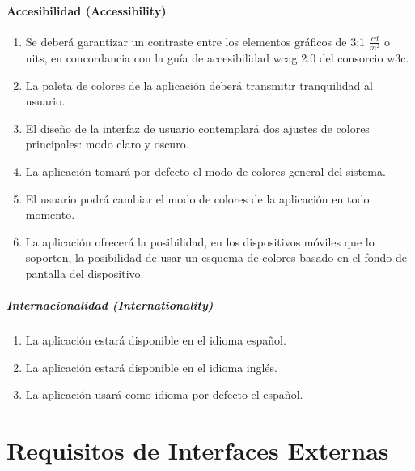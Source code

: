             \paragraph{Accesibilidad (Accessibility)}
                \begin{enumerate}[resume, label=\textbf{\texttt{RNF-\arabic*}}]
                    \item \label{req:no_funcionales:contraste} Se deberá garantizar un contraste entre los elementos gráficos de 3:1 $\frac{cd}{m^{2}}$ o nits, en concordancia con la guía de accesibilidad \gls{wcag} 2.0 del consorcio \gls{w3c}\cite{w3c_web_2008}.
                    \item \label{req:no_funcionales:colores_tranquilidad} La paleta de colores de la aplicación deberá transmitir tranquilidad al usuario.
                    \item \label{req:no_funcionales:modo_claro_oscuro} El diseño de la interfaz de usuario contemplará dos ajustes de colores principales: modo claro y oscuro.
                    \item \label{req:no_funcionales:modo_defecto} La aplicación tomará por defecto el modo de colores general del sistema.
                    \item \label{req:no_funcionales:modo_demanda} El usuario podrá cambiar el modo de colores de la aplicación en todo momento. 
                    \item \label{req:no_funcionales:colores_dinamico} La aplicación ofrecerá la posibilidad, en los dispositivos móviles que lo soporten, la posibilidad de usar un esquema de colores basado en el fondo de pantalla del dispositivo.
                \end{enumerate}
                
                \subparagraph{Internacionalidad (Internationality)}
                    \begin{enumerate}[resume, label=\textbf{\texttt{RNF-\arabic*}}]
                        \item \label{req:no_funcionales:idioma_espanol} La aplicación estará disponible en el idioma español.
                        \item \label{req:no_funcionales:idioma_ingles} La aplicación estará disponible en el idioma inglés.
                        \item \label{req:no_funcionales:idioma_defecto} La aplicación usará como idioma por defecto el español.
                    \end{enumerate}
\section{Requisitos de Interfaces Externas}
    \label{req:externas}

